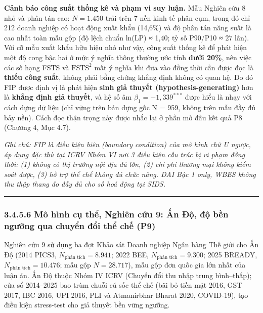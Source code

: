 \documentclass[
  a4paper,
  13pt]{extreport}
\begin{document}
\textbf{Cảnh báo công suất thống kê và phạm vi suy luận.} Mẫu Nghiên cứu
8 nhỏ và phân tán cao: \(N = 1.450\) trải trên 7 nền kinh tế phân cụm,
trong đó chỉ 212 doanh nghiệp có hoạt động xuất khẩu (14,6\%) và độ phân
tán năng suất là cao nhất toàn mẫu gộp (độ lệch chuẩn ln(LP) ≈ 1,40; tỷ
số P90/P10 ≈ 27 lần). Với cỡ mẫu xuất khẩu hữu hiệu nhỏ như vậy, công
suất thống kê để phát hiện một độ cong bậc hai ở mức ý nghĩa thông
thường ước tính \textbf{dưới 20\%}, nên việc các số hạng FSTS và
\(\text{FSTS}^2\) mất ý nghĩa khi đưa vào đồng thời cần được đọc là
\textbf{thiếu công suất}, không phải bằng chứng khẳng định không có quan
hệ. Do đó FIP được định vị là phát hiện \textbf{sinh giả thuyết
(hypothesis-generating)} hơn là \textbf{khẳng định giả thuyết}, và hệ số
âm \(\beta_1 = -1{,}339^{***}\) được hiểu là nhạy với cách dựng dữ liệu
(chỉ vững trên bản dựng gốc N = 959, không trên mẫu đầy đủ bảy nền).
Cách đọc thận trọng này được nhắc lại ở phần mở đầu kết quả P8 (Chương
4, Mục 4.7).

\emph{Ghi chú: FIP là điều kiện biên (boundary condition) của mô hình
chữ U ngược, áp dụng đặc thù tại ICRV Nhóm VI nơi 3 điều kiện cấu trúc
bị vi phạm đồng thời: (1) không có thị trường nội địa đủ lớn, (2) chi
phí thương mại không kiểm soát được, (3) hỗ trợ thể chế không đủ chức
năng. DAI Bậc 1 only, WBES không thu thập thang đo đầy đủ cho số hoá
động tại SIDS.}

\begin{center}\rule{0.5\linewidth}{0.5pt}\end{center}

\hypertarget{muxf4-huxecnh-cux1ee5-thux1ec3-nghiuxean-cux1ee9u-9-ux1ea5n-ux111ux1ed9-ux111ux1ed9-bux1ec1n-ngux1b0ux1ee1ng-qua-chuyux1ec3n-ux111ux1ed5i-thux1ec3-chux1ebf-p9}{%
\subsubsection{3.4.5.6 Mô hình cụ thể, Nghiên cứu 9: Ấn Độ, độ bền
ngưỡng qua chuyển đổi thể chế
(P9)}\label{muxf4-huxecnh-cux1ee5-thux1ec3-nghiuxean-cux1ee9u-9-ux1ea5n-ux111ux1ed9-ux111ux1ed9-bux1ec1n-ngux1b0ux1ee1ng-qua-chuyux1ec3n-ux111ux1ed5i-thux1ec3-chux1ebf-p9}}

Nghiên cứu 9 sử dụng ba đợt Khảo sát Doanh nghiệp Ngân hàng Thế giới cho
Ấn Độ (2014 PICS3, \(N_{\text{phân tích}} = 8.941\); 2022 BEE,
\(N_{\text{phân tích}} = 9.300\); 2025 BREADY,
\(N_{\text{phân tích}} = 10.476\); mẫu gộp \(N = 28.717\)), mẫu gộp đơn
quốc gia lớn nhất của luận án. Ấn Độ thuộc Nhóm IV ICRV (Chuyển đổi thu
nhập trung bình--thấp); cửa sổ 2014--2025 bao trùm chuỗi cú sốc thể chế
(bãi bỏ tiền mặt 2016, GST 2017, IBC 2016, UPI 2016, PLI và Atmanirbhar
Bharat 2020, COVID-19), tạo điều kiện stress-test cho giả thuyết bền
vững ngưỡng.
\end{document}
